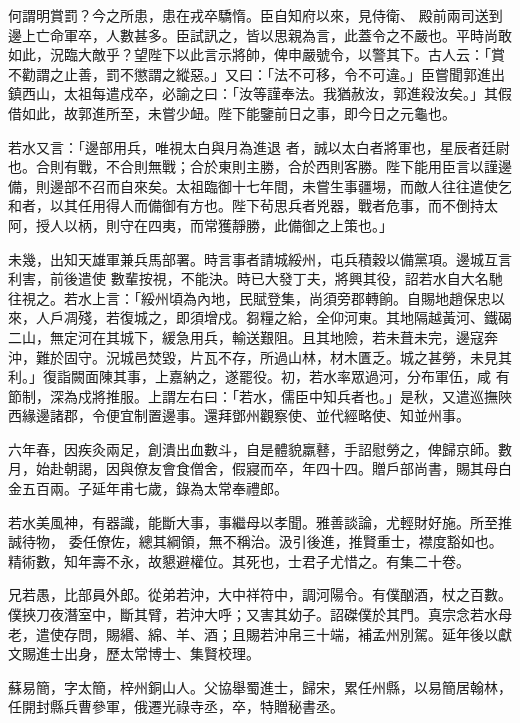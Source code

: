 \begin{pinyinscope}
 何謂明賞罰？今之所患，患在戎卒驕惰。臣自知府以來，見侍衛、
 殿前兩司送到邊上亡命軍卒，人數甚多。臣試訊之，皆以思親為言，此蓋令之不嚴也。平時尚敢如此，況臨大敵乎？望陛下以此言示將帥，俾申嚴號令，以警其下。古人云：「賞不勸謂之止善，罰不懲謂之縱惡。」又曰：「法不可移，令不可違。」臣嘗聞郭進出鎮西山，太祖每遣戍卒，必諭之曰：「汝等謹奉法。我猶赦汝，郭進殺汝矣。」其假借如此，故郭進所至，未嘗少衄。陛下能鑒前日之事，即今日之元龜也。



 若水又言：「邊部用兵，唯視太白與月為進退
 者，誠以太白者將軍也，星辰者廷尉也。合則有戰，不合則無戰；合於東則主勝，合於西則客勝。陛下能用臣言以謹邊備，則邊部不召而自來矣。太祖臨御十七年間，未嘗生事疆埸，而敵人往往遣使乞和者，以其任用得人而備御有方也。陛下茍思兵者兇器，戰者危事，而不倒持太阿，授人以柄，則守在四夷，而常獲靜勝，此備御之上策也。」



 未幾，出知天雄軍兼兵馬部署。時言事者請城綏州，屯兵積穀以備黨項。邊城互言利害，前後遣使
 數輩按視，不能決。時已大發丁夫，將興其役，詔若水自大名馳往視之。若水上言：「綏州頃為內地，民賦登集，尚須旁郡轉餉。自賜地趙保忠以來，人戶凋殘，若復城之，即須增戍。芻糧之給，全仰河東。其地隔越黃河、鐵碣二山，無定河在其城下，緩急用兵，輸送艱阻。且其地險，若未葺未完，邊寇奔沖，難於固守。況城邑焚毀，片瓦不存，所過山林，材木匱乏。城之甚勞，未見其利。」復詣闕面陳其事，上嘉納之，遂罷役。初，若水率眾過河，分布軍伍，咸
 有節制，深為戍將推服。上謂左右曰：「若水，儒臣中知兵者也。」是秋，又遣巡撫陜西緣邊諸郡，令便宜制置邊事。還拜鄧州觀察使、並代經略使、知並州事。



 六年春，因疾灸兩足，創潰出血數斗，自是體貌羸鼛，手詔慰勞之，俾歸京師。數月，始赴朝謁，因與僚友會食僧舍，假寢而卒，年四十四。贈戶部尚書，賜其母白金五百兩。子延年甫七歲，錄為太常奉禮郎。



 若水美風神，有器識，能斷大事，事繼母以孝聞。雅善談論，尤輕財好施。所至推誠待物，
 委任僚佐，總其綱領，無不稱治。汲引後進，推賢重士，襟度豁如也。精術數，知年壽不永，故懇避權位。其死也，士君子尤惜之。有集二十卷。



 兄若愚，比部員外郎。從弟若沖，大中祥符中，調河陽令。有僕酗酒，杖之百數。僕挾刀夜潛室中，斷其臂，若沖大呼；又害其幼子。詔磔僕於其門。真宗念若水母老，遣使存問，賜緡、綿、羊、酒；且賜若沖帛三十端，補孟州別駕。延年後以獻文賜進士出身，歷太常博士、集賢校理。



 蘇易簡，字太簡，梓州銅山人。父協舉蜀進士，歸宋，累任州縣，以易簡居翰林，任開封縣兵曹參軍，俄遷光祿寺丞，卒，特贈秘書丞。




\end{pinyinscope}
